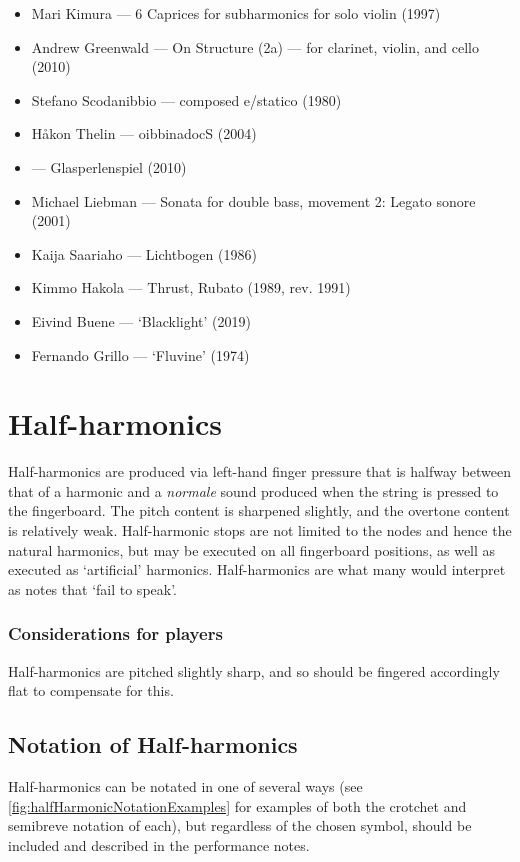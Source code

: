 \begin{itemize}
    \item Mari Kimura --- 6 Caprices for subharmonics for solo violin (1997) 
    \item Andrew Greenwald --- On Structure (2a) --- for clarinet, violin, and cello (2010)
    \item Stefano Scodanibbio --- composed e/statico (1980)
    \item Håkon Thelin --- oibbinadocS (2004)
    \item --- Glasperlenspiel (2010)
    \item Michael Liebman --- Sonata for double bass, movement 2: Legato sonore (2001)
    \item Kaija Saariaho --- Lichtbogen (1986)
    \item Kimmo Hakola --- Thrust, Rubato (1989, rev. 1991) 
    \item Eivind Buene --- `Blacklight' (2019)
    \item Fernando Grillo --- `Fluvine' (1974)
\end{itemize}

\section{Half-harmonics}\label{sec:half-harmonics}
Half-harmonics are produced via left-hand finger pressure that is halfway between that of a harmonic and a \emph{normale} sound produced when the string is pressed to the fingerboard.
The pitch content is sharpened slightly, and the overtone content is relatively weak.\autocite[113]{welbanksFoundationsModernCello}
Half-harmonic stops are not limited to the nodes and hence the natural harmonics, but may be executed on all fingerboard positions, as well as executed as `artificial' harmonics.\autocite[127]{dimpkerExtendedNotationDepiction2012} 
Half-harmonics are what many would interpret as notes that `fail to speak'.

\subsubsection{Considerations for players}
Half-harmonics are pitched slightly sharp, and so should be fingered accordingly flat to compensate for this.\autocite[113]{welbanksFoundationsModernCello}

\subsection{Notation of Half-harmonics}\label{sec:notation-half-harmonics}
Half-harmonics can be notated in one of several ways (see \autoref{fig:halfHarmonicNotationExamples} for examples of both the crotchet and semibreve notation of each), but regardless of the chosen symbol, should be included and described in the performance notes.


